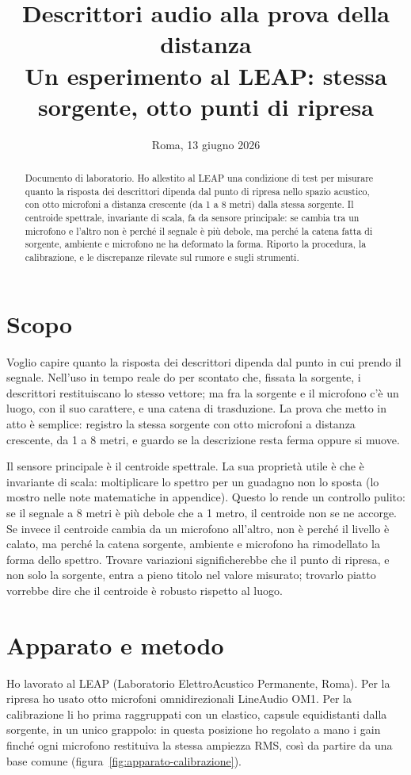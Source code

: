 \documentclass[11pt,a4paper]{article}
\title{Descrittori audio alla prova della distanza\\
\large Un esperimento al LEAP: stessa sorgente, otto punti di ripresa}
\author{}
\date{Roma, 13 giugno 2026}
\begin{document}
\maketitle

\begin{abstract}
Documento di laboratorio. Ho allestito al LEAP una condizione di test per misurare
quanto la risposta dei descrittori dipenda dal punto di ripresa nello spazio acustico,
con otto microfoni a distanza crescente (da 1 a 8 metri) dalla stessa sorgente. Il
centroide spettrale, invariante di scala, fa da sensore principale: se cambia tra un
microfono e l'altro non è perché il segnale è più debole, ma perché la catena
fatta di sorgente, ambiente e microfono ne ha deformato la forma. Riporto la procedura, la
calibrazione, e le discrepanze rilevate sul rumore e sugli strumenti.
\end{abstract}

\section{Scopo}
Voglio capire quanto la risposta dei descrittori dipenda dal punto in cui prendo
il segnale. Nell'uso in tempo reale do per scontato che, fissata la sorgente, i
descrittori restituiscano lo stesso vettore; ma fra la sorgente e il microfono c'è
un luogo, con il suo carattere, e una catena di trasduzione. La prova che metto in
atto è semplice: registro la stessa sorgente con otto microfoni a distanza crescente,
da 1 a 8 metri, e guardo se la descrizione resta ferma oppure si muove.

Il sensore principale è il centroide spettrale. La sua proprietà utile è che è
invariante di scala: moltiplicare lo spettro per un guadagno non lo sposta (lo mostro
nelle note matematiche in appendice). Questo
lo rende un controllo pulito: se il segnale a 8 metri è più debole che a 1 metro, il
centroide non se ne accorge. Se invece il centroide cambia da un microfono all'altro,
non è perché il livello è calato, ma perché la catena sorgente, ambiente e microfono
ha rimodellato la forma dello spettro. Trovare variazioni significherebbe che il punto
di ripresa, e non solo la sorgente, entra a pieno titolo nel valore misurato; trovarlo
piatto vorrebbe dire che il centroide è robusto rispetto al luogo.

\section{Apparato e metodo}
Ho lavorato al LEAP (Laboratorio ElettroAcustico Permanente, Roma). Per la ripresa ho
usato otto microfoni omnidirezionali LineAudio OM1. Per la calibrazione li ho prima
raggruppati con un elastico, capsule equidistanti dalla sorgente, in un unico grappolo:
in questa posizione ho regolato a mano i gain finché ogni microfono restituiva la stessa
ampiezza RMS, così da partire da una base comune (figura~\ref{fig:apparato-calibrazione}).
\end{document}
